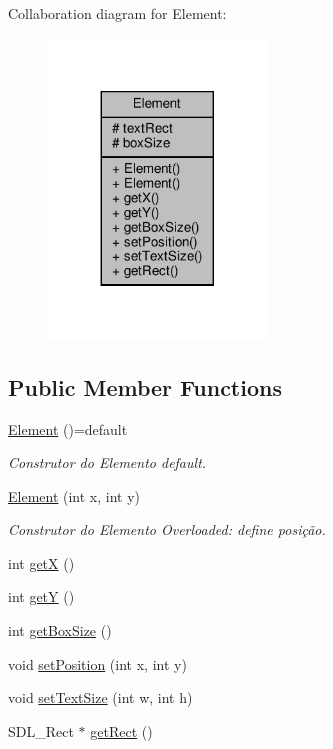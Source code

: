 Collaboration diagram for Element\+:
\nopagebreak
\begin{figure}[H]
\begin{center}
\leavevmode
\includegraphics[width=164pt]{classElement__coll__graph}
\end{center}
\end{figure}
\subsection*{Public Member Functions}
\begin{DoxyCompactItemize}
\item 
\hyperlink{classElement_a084081001b0f14ae12d612c866df861c}{Element} ()=default
\begin{DoxyCompactList}\small\item\em Construtor do Elemento default. \end{DoxyCompactList}\item 
\hyperlink{classElement_ae385b104c66f092731777d70775b7f55}{Element} (int x, int y)
\begin{DoxyCompactList}\small\item\em Construtor do Elemento Overloaded\+: define posição. \end{DoxyCompactList}\item 
int \hyperlink{classElement_ab5e2530eac11f0281769e6689856ceb2}{getX} ()
\item 
int \hyperlink{classElement_aad10853bfba140e4ca5cab79d72f2d83}{getY} ()
\item 
int \hyperlink{classElement_a9bb602a1a56055ea4b360b1a5486ff24}{get\+Box\+Size} ()
\item 
void \hyperlink{classElement_a3f07a8ce2682d6bdd56db0ef3de858c0}{set\+Position} (int x, int y)
\item 
void \hyperlink{classElement_af3ad245bd04436524f8bd5c5835bf786}{set\+Text\+Size} (int w, int h)
\item 
S\+D\+L\+\_\+\+Rect $\ast$ \hyperlink{classElement_ac8e7a2a1670e95335b6924b873600ea3}{get\+Rect} ()
\end{DoxyCompactItemize}
